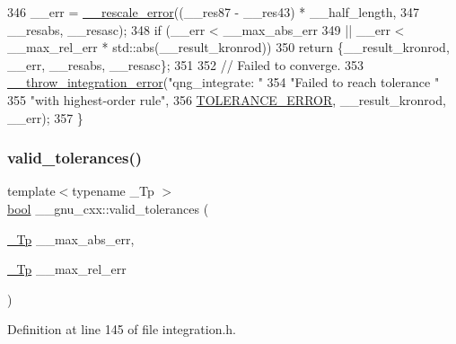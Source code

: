 \begin{DoxyCode}
346       \_\_err = \hyperlink{namespace____gnu__cxx_aeff8a54364ae3976f593b8699626a897}{\_\_rescale\_error}((\_\_res87 - \_\_res43) * \_\_half\_length,
347                                 \_\_resabs, \_\_resasc);
348       \textcolor{keywordflow}{if} (\_\_err < \_\_max\_abs\_err
349        || \_\_err < \_\_max\_rel\_err * std::abs(\_\_result\_kronrod))
350         \textcolor{keywordflow}{return} \{\_\_result\_kronrod, \_\_err, \_\_resabs, \_\_resasc\};
351 
352       \textcolor{comment}{// Failed to converge.}
353       \hyperlink{namespace____gnu__cxx_a2ae22137ca092b8ae10f4d42b4e32cfb}{\_\_throw\_integration\_error}(\textcolor{stringliteral}{"qng\_integrate: "}
354                                 \textcolor{stringliteral}{"Failed to reach tolerance "}
355                                 \textcolor{stringliteral}{"with highest-order rule"},
356                                 \hyperlink{namespace____gnu__cxx_ad6c62dd86a596716cece6ac2d4cfd4b3ab7427fd44a0ed217814ca07b9b5aba07}{TOLERANCE\_ERROR}, \_\_result\_kronrod, \_\_err);
357     \}
\end{DoxyCode}
\mbox{\label{namespace____gnu__cxx_a86b1d89b2e2cb97614fdf3425d3dccd5}} 
\subsubsection{\texorpdfstring{valid\+\_\+tolerances()}{valid\_tolerances()}}
{\footnotesize\ttfamily template$<$typename \+\_\+\+Tp $>$ \\
\hyperlink{namespace____gnu__cxx_ae83aca57f97767d5d09188718728a0ac}{bool} \+\_\+\+\_\+gnu\+\_\+cxx\+::valid\+\_\+tolerances (\begin{DoxyParamCaption}\item[{\hyperlink{namespace____gnu__cxx_a3b19a9c800ca194374ef9172290f7d79}{\+\_\+\+Tp}}]{\+\_\+\+\_\+max\+\_\+abs\+\_\+err,  }\item[{\hyperlink{namespace____gnu__cxx_a3b19a9c800ca194374ef9172290f7d79}{\+\_\+\+Tp}}]{\+\_\+\+\_\+max\+\_\+rel\+\_\+err }\end{DoxyParamCaption})\hspace{0.3cm}{\ttfamily [inline]}}



Definition at line 145 of file integration.\+h.



